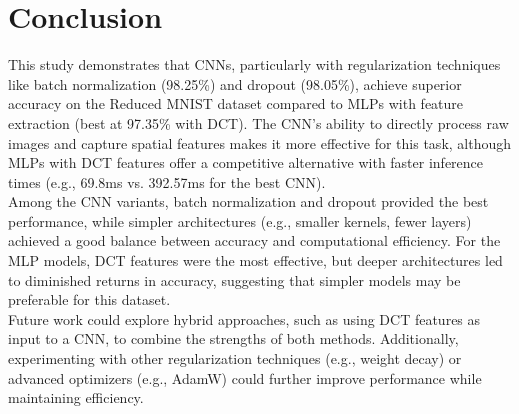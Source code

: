 \documentclass[a4paper,12pt]{article}
\begin{document}
\section{Conclusion}
This study demonstrates that CNNs, particularly with regularization techniques like batch normalization (98.25\%) and dropout (98.05\%), achieve superior accuracy on the Reduced MNIST dataset compared to MLPs with feature extraction (best at 97.35\% with DCT). The CNN's ability to directly process raw images and capture spatial features makes it more effective for this task, although MLPs with DCT features offer a competitive alternative with faster inference times (e.g., 69.8ms vs. 392.57ms for the best CNN).\\
Among the CNN variants, batch normalization and dropout provided the best performance, while simpler architectures (e.g., smaller kernels, fewer layers) achieved a good balance between accuracy and computational efficiency. For the MLP models, DCT features were the most effective, but deeper architectures led to diminished returns in accuracy, suggesting that simpler models may be preferable for this dataset.\\
Future work could explore hybrid approaches, such as using DCT features as input to a CNN, to combine the strengths of both methods. Additionally, experimenting with other regularization techniques (e.g., weight decay) or advanced optimizers (e.g., AdamW) could further improve performance while maintaining efficiency.
\end{document}
